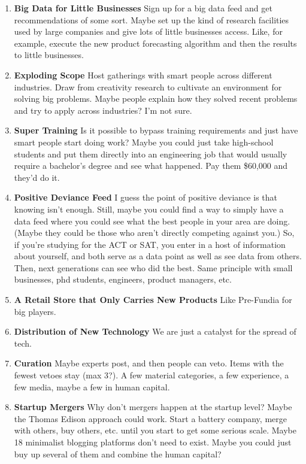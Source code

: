 \documentclass[paper=a4, fontsize=11pt]{scrartcl} %
\numberwithin{equation}{section} %
\numberwithin{figure}{section} %
\numberwithin{table}{section} %
\begin{document}
\begin{enumerate}
\item \textbf{Big Data for Little Businesses}  Sign up for a big data feed and get recommendations of some sort.  Maybe set up the kind of research facilities used by large companies and give lots of little businesses access.  Like, for example, execute the new product forecasting algorithm and then the results to little businesses.

\item \textbf{Exploding Scope}  Host gatherings with smart people across different industries.  Draw from creativity research to cultivate an environment for solving big problems.  Maybe people explain how they solved recent problems and try to apply across industries?  I'm not sure.

\item \textbf{Super Training} Is it possible to bypass training requirements and just have smart people start doing work?  Maybe you could just take high-school students and put them directly into an engineering job that would usually require a bachelor's degree and see what happened.  Pay them \$60,000 and they'd do it.  

\item \textbf{Positive Deviance Feed}  I guess the point of positive deviance is that knowing isn't enough.  Still, maybe you could find a way to simply have a data feed where you could see what the best people in your area are doing.  (Maybe they could be those who aren't directly competing against you.)  So, if you're studying for the ACT or SAT, you enter in a host of information about yourself, and both serve as a data point as well as see data from others.  Then, next generations can see who did the best.  Same principle with small businesses, phd students, engineers, product managers, etc.

\item \textbf{A Retail Store that Only Carries New Products}  Like Pre-Fundia for big players.

\item \textbf{Distribution of New Technology} We are just a catalyst for the spread of tech.  

\item \textbf{Curation}  Maybe experts post, and then people can veto.  Items with the fewest vetoes stay (max 3?).  A few material categories, a few experience, a few media, maybe a few in human capital.  

\item \textbf{Startup Mergers}  Why don't mergers happen at the startup level?  Maybe the Thomas Edison approach could work.  Start a battery company, merge with others, buy others, etc. until you start to get some serious scale.  Maybe 18 minimalist blogging platforms don't need to exist.  Maybe you could just buy up several of them and combine the human capital? 


\end{enumerate}
\end{document}
